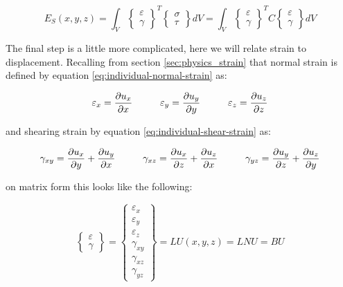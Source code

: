 \begin{equation}
E_S (x,y,z) = \int_V 
\begin{Bmatrix}
\varepsilon \\
\gamma
\end{Bmatrix}
^T
\begin{Bmatrix}
\sigma \\
\tau
\end{Bmatrix}
dV = \int_V
\begin{Bmatrix}
\varepsilon \\
\gamma
\end{Bmatrix}
^T C
\begin{Bmatrix}
\varepsilon \\
\gamma
\end{Bmatrix}
dV
\end{equation}

The final step is a little more complicated, here we will relate
strain to displacement. Recalling from section
\vref{sec:physics_strain} that normal strain is defined by equation
\eqref{eq:individual-normal-strain} as:

\begin{equation*}
\varepsilon_x = \frac{\partial u_x}{\partial x} \hspace{10 mm}
\varepsilon_y = \frac{\partial u_y}{\partial y} \hspace{10 mm}
\varepsilon_z = \frac{\partial u_z}{\partial z}
\end{equation*}

and shearing strain by equation \eqref{eq:individual-shear-strain} as:

\begin{equation*}
  \gamma_{xy} = \frac{\partial u_x}{\partial y} +
  \frac{\partial u_y}{\partial x} \hspace{10 mm}
  \gamma_{xz} = \frac{\partial u_x}{\partial z} +
  \frac{\partial u_z}{\partial x} \hspace{10 mm}
  \gamma_{yz} = \frac{\partial u_y}{\partial z} +
  \frac{\partial u_z}{\partial y}
\end{equation*}

on matrix form this looks like the following:

\begin{equation}
\begin{Bmatrix}
\varepsilon \\
\gamma
\end{Bmatrix}
= 
\begin{Bmatrix}
\varepsilon_x \\
\varepsilon_y \\
\varepsilon_z \\
\gamma_{xy} \\
\gamma_{xz} \\
\gamma_{yz}
\end{Bmatrix}
= L U(x,y,z) = L N U = B U
\end{equation}

